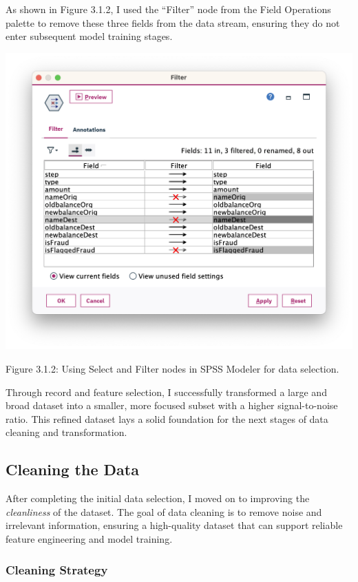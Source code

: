 \documentclass[sigplan,screen]{acmart}
\begin{document}
As shown in Figure 3.1.2, I used the ``Filter'' node from the   Field Operations palette to remove these three fields from the data stream, ensuring they do not enter subsequent model training stages.

\vspace{0.3cm}

\begin{center}
\includegraphics[width=0.9\columnwidth]{3.1.2.png}
\vspace{0.2cm}

Figure 3.1.2: Using Select and Filter nodes in SPSS Modeler for data selection.
\end{center}

\vspace{0.3cm}
Through record and feature selection, I successfully transformed a large and broad dataset into a smaller, more focused subset with a higher signal-to-noise ratio. This refined dataset lays a solid foundation for the next stages of data cleaning and transformation.

\subsection{Cleaning the Data}
    
After completing the initial data selection, I moved on to improving the \textit{cleanliness} of the dataset. The goal of data cleaning is to remove noise and irrelevant information, ensuring a high-quality dataset that can support reliable feature engineering and model training.
    
\subsubsection{Cleaning Strategy}
    
\end{document}
